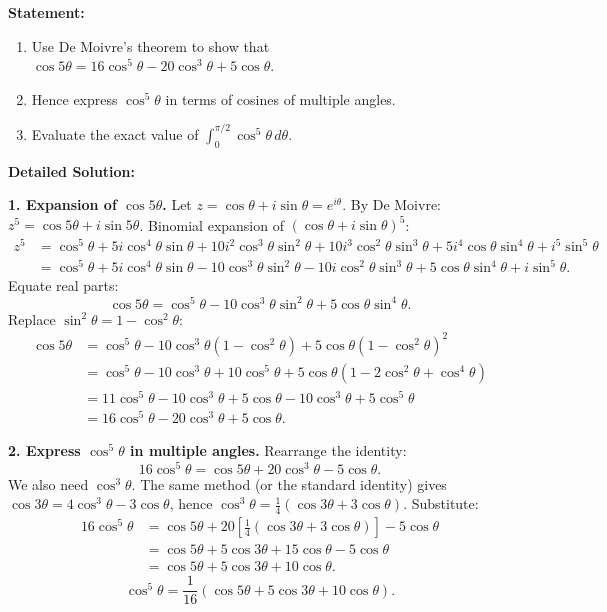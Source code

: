 \documentclass[11pt]{article}
\begin{document}
\begin{exoresolu}
\textbf{Statement:}
\begin{enumerate}
    \item Use De Moivre's theorem to show that $\cos 5\theta = 16\cos^5\theta - 20\cos^3\theta + 5\cos\theta$.
    \item Hence express $\cos^5\theta$ in terms of cosines of multiple angles.
    \item Evaluate the exact value of $\displaystyle\int_0^{\pi/2} \cos^5\theta\, d\theta$.
\end{enumerate}

\tcblower
\textbf{Detailed Solution:}

\textbf{1. Expansion of $\cos 5\theta$.}
Let $z = \cos\theta + i\sin\theta = e^{i\theta}$.
By De Moivre: $z^5 = \cos 5\theta + i\sin 5\theta$.
Binomial expansion of $(\cos\theta + i\sin\theta)^5$:
\begin{align*}
z^5 &= \cos^5\theta + 5i\cos^4\theta\sin\theta + 10i^2\cos^3\theta\sin^2\theta + 10i^3\cos^2\theta\sin^3\theta + 5i^4\cos\theta\sin^4\theta + i^5\sin^5\theta \\
&= \cos^5\theta + 5i\cos^4\theta\sin\theta - 10\cos^3\theta\sin^2\theta - 10i\cos^2\theta\sin^3\theta + 5\cos\theta\sin^4\theta + i\sin^5\theta.
\end{align*}
Equate real parts:
\[
\cos 5\theta = \cos^5\theta - 10\cos^3\theta\sin^2\theta + 5\cos\theta\sin^4\theta.
\]
Replace $\sin^2\theta = 1-\cos^2\theta$:
\begin{align*}
\cos 5\theta &= \cos^5\theta - 10\cos^3\theta(1-\cos^2\theta) + 5\cos\theta(1-\cos^2\theta)^2 \\
&= \cos^5\theta - 10\cos^3\theta + 10\cos^5\theta + 5\cos\theta(1 - 2\cos^2\theta + \cos^4\theta) \\
&= 11\cos^5\theta - 10\cos^3\theta + 5\cos\theta - 10\cos^3\theta + 5\cos^5\theta \\
&= \boxed{16\cos^5\theta - 20\cos^3\theta + 5\cos\theta}.
\end{align*}

\textbf{2. Express $\cos^5\theta$ in multiple angles.}
Rearrange the identity:
\[
16\cos^5\theta = \cos 5\theta + 20\cos^3\theta - 5\cos\theta.
\]
We also need $\cos^3\theta$. The same method (or the standard identity) gives $\cos 3\theta = 4\cos^3\theta - 3\cos\theta$, hence $\cos^3\theta = \frac{1}{4}(\cos 3\theta + 3\cos\theta)$.
Substitute:
\begin{align*}
16\cos^5\theta &= \cos 5\theta + 20\left[\frac{1}{4}(\cos 3\theta + 3\cos\theta)\right] - 5\cos\theta \\
&= \cos 5\theta + 5\cos 3\theta + 15\cos\theta - 5\cos\theta \\
&= \cos 5\theta + 5\cos 3\theta + 10\cos\theta.
\end{align*}
\[
\boxed{\cos^5\theta = \frac{1}{16}(\cos 5\theta + 5\cos 3\theta + 10\cos\theta)}.
\]


\end{exoresolu}
\end{document}
